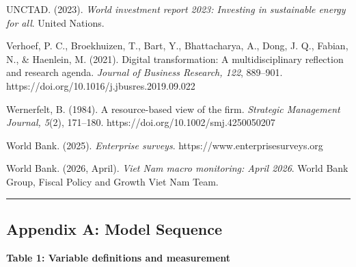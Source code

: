 \documentclass[
  12pt,a4paper]{article}
\begin{document}
UNCTAD. (2023). \emph{World investment report 2023: Investing in
sustainable energy for all}. United Nations.

Verhoef, P. C., Broekhuizen, T., Bart, Y., Bhattacharya, A., Dong, J.
Q., Fabian, N., \& Haenlein, M. (2021). Digital transformation: A
multidisciplinary reflection and research agenda. \emph{Journal of
Business Research, 122}, 889--901.
https://doi.org/10.1016/j.jbusres.2019.09.022

Wernerfelt, B. (1984). A resource-based view of the firm.
\emph{Strategic Management Journal, 5}(2), 171--180.
https://doi.org/10.1002/smj.4250050207

World Bank. (2025). \emph{Enterprise surveys}.
https://www.enterprisesurveys.org

World Bank. (2026, April). \emph{Viet Nam macro monitoring: April 2026}.
World Bank Group, Fiscal Policy and Growth Viet Nam Team.

\begin{center}\rule{0.5\linewidth}{0.5pt}\end{center}

\hypertarget{appendix-a-model-sequence}{%
\subsection{Appendix A: Model
Sequence}\label{appendix-a-model-sequence}}

\textbf{Table 1: Variable definitions and measurement}
\end{document}
